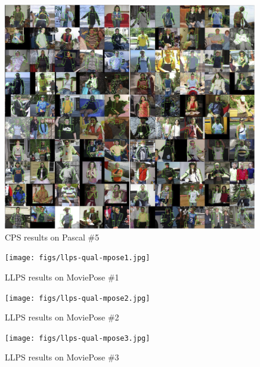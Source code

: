 \begin{figure}[tb]
\begin{center}
\includegraphics[width=0.99\textwidth]{figs/pascal-cps-5.jpg}
\caption[CPS results on Pascal \#5]{CPS results on Pascal \#5}
\label{fig:pascal-cps5}
\end{center}
\end{figure}


\begin{figure}[tb]
\begin{center}
\texttt{[image: figs/llps-qual-mpose1.jpg]}
\vspace{-0.25in}
\caption[LLPS results on MoviePose \#1]{LLPS results on MoviePose \#1}
\label{fig:llps1}
\end{center}
\end{figure}

\begin{figure}[tb]
\begin{center}
\texttt{[image: figs/llps-qual-mpose2.jpg]}
\vspace{-0.25in}
\caption[LLPS results on MoviePose \#2]{LLPS results on MoviePose \#2}
\label{fig:llps2}
\end{center}
\end{figure}

\begin{figure}[tb]
\begin{center}
\texttt{[image: figs/llps-qual-mpose3.jpg]}
\vspace{-0.25in}
\caption[LLPS results on MoviePose \#3.]{LLPS results on MoviePose \#3}
\label{fig:llps3}
\end{center}
\end{figure}



